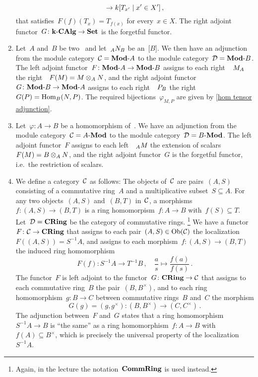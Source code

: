 \begin{example}
\begin{enumerate}
\[        \to     k[T_{x'} \suchthat x' \in X'] \,,
      \]
      that satisfies~$F(f)(T_x) = T_{f(x)}$ for every~$x \in X$.
      The right adjoint functor~$G \colon \text{$\mathbf{k}$-$\mathbf{CAlg}$} \to \mathbf{Set}$ is the forgetful functor.
    \item
      Let~$A$ and~$B$ be two~{\kalgs} and let~$\indmodule[A]{N}[B]$ be an~{[$B$]}.
      We then have an adjunction from the module category~$\mathcal{C} = \text{$\mathbf{Mod}$-$A$}$ to the module category~$\mathcal{D} = \text{$\mathbf{Mod}$-$B$}$.
      The left adjoint functor~$F \colon \text{$\mathbf{Mod}$-$A$} \to \text{$\mathbf{Mod}$-$B$}$ assigns to each right~{}~$\indmodule{M}[A]$ the right~{}~$F(M) = M \otimes_A N$, and the right adjoint functor~$G \colon \text{$\mathbf{Mod}$-$B$} \to \text{$\mathbf{Mod}$-$A$}$ assigns to each right~{}~$\indmodule{P}[B]$ the right~{}~$G(P) = \operatorname{Hom}_B(N,P)$.
      The required bijections~$\varphi_{M,P}$ are given by \cref{hom tensor adjunction}.
    \item
      Let~$\varphi \colon A \to B$ be a homomorphism of~{\kalgs}.
      We have an adjunction from the module category~$\mathcal{C} = \text{$A$-$\mathbf{Mod}$}$ to the module category~$\mathcal{D} = \text{$B$-$\mathbf{Mod}$}$.
      The left adjoint functor~$F$ assigns to each left~{}~$\indmodule[A]{M}$ the extension of scalars~$F(M) = B \otimes_A N$, and the right adjoint functor~$G$ is the forgetful functor, i.e.\ the restriction of scalars.
    \item
      We define a category~$\mathcal{C}$ as follows:
      The objects of~$\mathcal{C}$ are pairs~$(A,S)$ consisting of a commutative ring~$A$ and a multiplicative subset~$S \subseteq A$.
      For any two objects~$(A,S)$ and~$(B,T)$ in~$\mathcal{C}$, a morphisms~$f \colon (A,S) \to (B,T)$ is a ring homomorpism~$f \colon A \to B$ with~$f(S) \subseteq T$.
      Let~$\mathcal{D} = \mathbf{CRing}$ be the category of commutative rings.%
      \footnote{Again, in the lecture the notation~$\mathbf{CommRing}$ is used instead.}
      We have a functor~$F \colon \mathcal{C} \to \mathbf{CRing}$ that assigns to each pair~$(A,S) \in \operatorname{Ob}(\mathcal{C})$ the localization~$F((A,S)) = S^{-1} A$, and assigns to each morphism~$f \colon (A,S) \to (B,T)$ the induced ring homomorphism
      \[
                F(f)
        \colon  S^{-1} A
        \to     T^{-1} B \,,
        \quad   \frac{a}{s}
        \mapsto \frac{f(a)}{f(s)} \,.
      \]
      The functor~$F$ is left adjoint to the functor~$G \colon \mathbf{CRing} \to \mathcal{C}$ that assigns to each commutative ring~$B$ the pair~$(B,B^\times)$, and to each ring homomorphism~$g \colon B \to C$ between commutative rings~$B$ and~$C$ the morphism
      \[
                G(g)
        =       (g, g^\times)
        \colon  (B, B^\times)
        \to     (C, C^\times) \,.
      \]
      The adjunction between~$F$ and~$G$ states that a ring homomorphism~$S^{-1} A \to B$ is \enquote{the same} as a ring homomorphism~$f \colon A \to B$ with~$f(A) \subseteq B^\times$, which is precisely the universal property of the localization~$S^{-1} A$.
  \end{enumerate}
\end{example}


